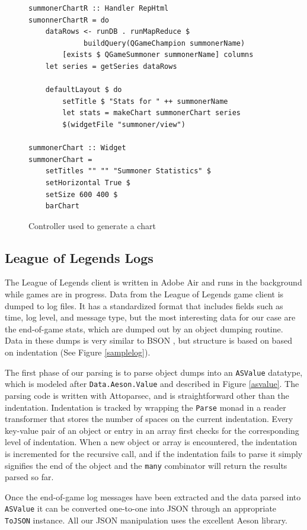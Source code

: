 \documentclass[letterpaper,twocolumn,9pt]{article}
\newcommand{\code}[1]{\texttt{#1}}
\begin{document}
\begin{figure}[]
\footnotesize{
\begin{verbatim}
summonerChartR :: Handler RepHtml
sumonnerChartR = do
    dataRows <- runDB . runMapReduce $
             buildQuery(QGameChampion summonerName)
        [exists $ QGameSummoner summonerName] columns
    let series = getSeries dataRows

    defaultLayout $ do
        setTitle $ "Stats for " ++ summonerName
        let stats = makeChart summonerChart series
        $(widgetFile "summoner/view")

summonerChart :: Widget
summonerChart =
    setTitles "" "" "Summoner Statistics" $
    setHorizontal True $
    setSize 600 400 $
    barChart
\end{verbatim}
}
    \caption{Controller used to generate a chart}
    \label{chartcode}
\end{figure}

\subsection{League of Legends Logs}

The League of Legends client is written in Adobe Air and runs in the background while games are in progress. Data from the League of Legends game client is dumped to log files.  It has a standardized format that includes fields such as time, log level, and message type, but the most interesting data for our case are the end-of-game stats, which are dumped out by an object dumping routine.  Data in these dumps is very similar to BSON , but structure is based on based on indentation (See Figure \ref{samplelog}).

The first phase of our parsing is to parse object dumps into an \code{ASValue} datatype, which is modeled after \code{Data.Aeson.Value} and described in Figure \ref{asvalue}.  The parsing code is written with Attoparsec, and is straightforward other than the indentation.  Indentation is tracked by wrapping the \code{Parse} monad in a reader transformer that stores the number of spaces on the current indentation.  Every key-value pair of an object or entry in an array first checks for the corresponding level of indentation.  When a new object or array is encountered, the indentation is incremented for the recursive call, and if the indentation fails to parse it simply signifies the end of the object and the \code{many} combinator will return the results parsed so far.

Once the end-of-game log messages have been extracted and the data parsed into \code{ASValue} it can be converted one-to-one into JSON through an appropriate \code{ToJSON} instance.  All our JSON manipulation uses the excellent Aeson library.
\end{document}
